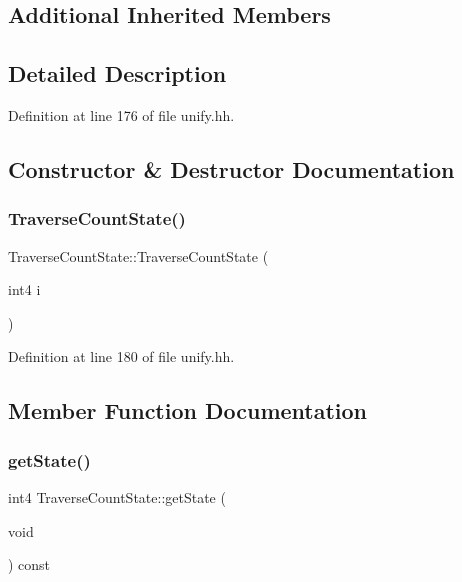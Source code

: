 \subsection*{Additional Inherited Members}


\subsection{Detailed Description}


Definition at line 176 of file unify.\+hh.



\subsection{Constructor \& Destructor Documentation}
\mbox{\label{class_traverse_count_state_ae003c367c0e05caf62befa815b047148}} 
\subsubsection{\texorpdfstring{TraverseCountState()}{TraverseCountState()}}
{\footnotesize\ttfamily Traverse\+Count\+State\+::\+Traverse\+Count\+State (\begin{DoxyParamCaption}\item[{int4}]{i }\end{DoxyParamCaption})\hspace{0.3cm}{\ttfamily [inline]}}



Definition at line 180 of file unify.\+hh.



\subsection{Member Function Documentation}
\mbox{\label{class_traverse_count_state_a3090ac13f5036cd991a297f15584a649}} 
\subsubsection{\texorpdfstring{getState()}{getState()}}
{\footnotesize\ttfamily int4 Traverse\+Count\+State\+::get\+State (\begin{DoxyParamCaption}\item[{void}]{ }\end{DoxyParamCaption}) const\hspace{0.3cm}{\ttfamily [inline]}}



